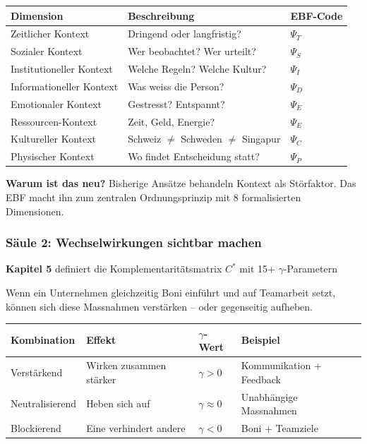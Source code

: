 \documentclass[11pt,a4paper]{article}
\begin{document}
\begin{center}
\begin{tabular}{lll}
\toprule
\textbf{Dimension} & \textbf{Beschreibung} & \textbf{EBF-Code} \\
\midrule
Zeitlicher Kontext & Dringend oder langfristig? & $\Psi_T$ \\
Sozialer Kontext & Wer beobachtet? Wer urteilt? & $\Psi_S$ \\
Institutioneller Kontext & Welche Regeln? Welche Kultur? & $\Psi_I$ \\
Informationeller Kontext & Was weiss die Person? & $\Psi_D$ \\
Emotionaler Kontext & Gestresst? Entspannt? & $\Psi_E$ \\
Ressourcen-Kontext & Zeit, Geld, Energie? & $\Psi_E$ \\
Kultureller Kontext & Schweiz $\neq$ Schweden $\neq$ Singapur & $\Psi_C$ \\
Physischer Kontext & Wo findet Entscheidung statt? & $\Psi_P$ \\
\bottomrule
\end{tabular}
\end{center}

\textbf{Warum ist das neu?} Bisherige Ansätze behandeln Kontext als Störfaktor. Das EBF macht ihn zum zentralen Ordnungsprinzip mit 8 formalisierten Dimensionen.

\subsubsection{Säule 2: Wechselwirkungen sichtbar machen}

\begin{ebfbox}
\textbf{Kapitel 5} definiert die Komplementaritätsmatrix $C^*$ mit 15+ $\gamma$-Parametern
\end{ebfbox}

Wenn ein Unternehmen gleichzeitig Boni einführt und auf Teamarbeit setzt, können sich diese Massnahmen verstärken -- oder gegenseitig aufheben.

\begin{center}
\begin{tabular}{llll}
\toprule
\textbf{Kombination} & \textbf{Effekt} & \textbf{$\gamma$-Wert} & \textbf{Beispiel} \\
\midrule
Verstärkend & Wirken zusammen stärker & $\gamma > 0$ & Kommunikation + Feedback \\
Neutralisierend & Heben sich auf & $\gamma \approx 0$ & Unabhängige Massnahmen \\
Blockierend & Eine verhindert andere & $\gamma < 0$ & Boni + Teamziele \\
\bottomrule
\end{tabular}
\end{center}
\end{document}
